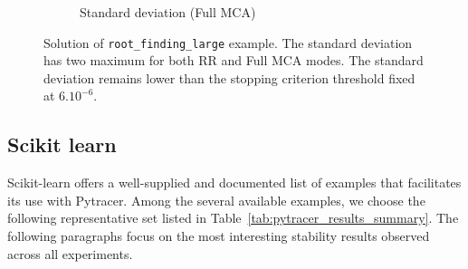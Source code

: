 \documentclass[10pt,journal,compsoc]{IEEEtran}
\begin{document}
\begin{figure}
\begin{subfigure}{0.45\linewidth}
        \caption{Standard deviation (Full MCA)}
        \label{fig:stdev_mca}
    \end{subfigure}
    \caption{Solution of \texttt{root\_finding\_large} example.
        The standard deviation has two maximum for both RR and Full MCA modes. The standard deviation remains lower than
        the stopping criterion threshold fixed at $6.10^{-6}$. }
    \label{fig:root_finding_large}
\end{figure}



\subsection{Scikit learn}
\label{sec:sklearn_tests}

Scikit-learn offers a well-supplied and documented list of examples that
facilitates its use with Pytracer. Among the several available examples, we
choose the following representative set listed in
Table~\ref{tab:pytracer_results_summary}. The following paragraphs focus on the
most interesting stability results observed across all experiments.
\end{document}
